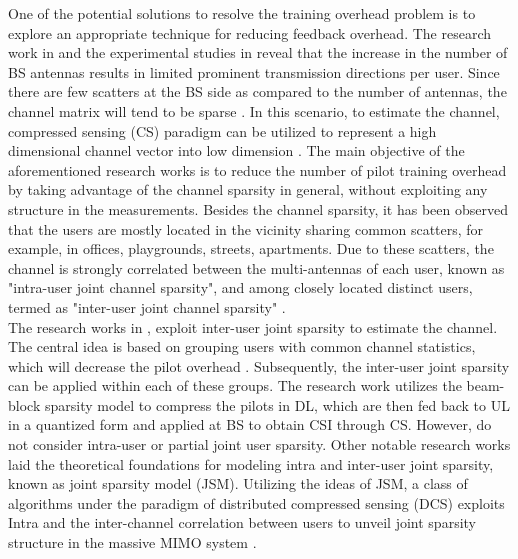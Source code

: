 One of the potential solutions to resolve the training overhead problem is to explore an appropriate technique for reducing feedback overhead.
The research work in \cite{sparse_channel} and the experimental studies in \cite{exp-vitual} reveal that the increase in the number of BS antennas results in limited prominent transmission directions per user.  Since there are few scatters at the BS side as compared to the number of antennas, the channel matrix will tend to be sparse \cite{mainref-joint,exp-vitual}. 
In this scenario, to estimate the channel, compressed sensing (CS) paradigm can be utilized to represent a high dimensional channel vector into low dimension \cite{ourwork,Dict_learning,sparse_channel}. The main objective of the aforementioned research works is to reduce the number of pilot training overhead by taking advantage of the channel sparsity in general, without exploiting any structure in the measurements. Besides the channel sparsity, it has been observed that the users are mostly located in the vicinity sharing common scatters, for example, in offices, playgrounds, streets, apartments. Due to these scatters, the channel is strongly correlated between the multi-antennas of each user, known as  "intra-user joint channel sparsity", and among closely located distinct users,  termed as "inter-user joint channel sparsity"  \cite{book_enrico}. \\
The research works in \cite{usr_grp,beamblock}, exploit inter-user joint sparsity to estimate the channel. The central idea is based on grouping users with common channel statistics, which will decrease the pilot overhead \cite{usr_grp}. Subsequently, the inter-user joint sparsity can be applied within each of these groups. The research work \cite{beamblock} utilizes the beam-block sparsity model to compress the pilots in DL, which are then fed back to UL in a quantized form and applied at BS to obtain CSI through CS.
However, \cite{usr_grp,beamblock} do not consider intra-user or partial joint user sparsity. Other notable research works \cite{distributed_cs, JSM} laid the theoretical foundations for modeling intra and inter-user joint sparsity, known as joint sparsity model (JSM).  Utilizing the ideas of JSM, a class of algorithms under the paradigm of distributed compressed sensing (DCS) exploits Intra and the inter-channel correlation between users to unveil joint sparsity structure in the massive MIMO system \cite{mimo-common-sparsity, mainref-joint,mainref-1bit,distributed_def}. 

